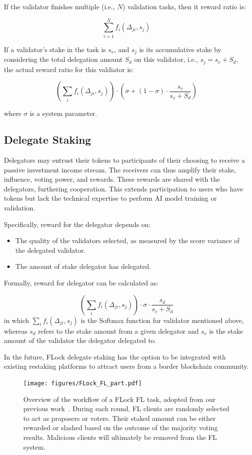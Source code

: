\documentclass[conference]{IEEEtran}
\begin{document}
If the validator finishes multiple (i.e., $N$) validation tasks, then it reward ratio is:

$$\sum_{i = 1}^{N}{f_i(\Delta_{ji}, s_j)}$$


If a validator’s stake in the task is $s_v$, and $s_j$ is its accumulative stake by considering the total delegation amount $S_d$ on this validator, i.e., $s_j = s_v + S_d$, the actual reward ratio for this valdiator is:

$$\left(\sum_i{f_i(\Delta_{ji}, s_j)}\right) \cdot \left(\sigma + (1-\sigma) \cdot \frac{s_v}{s_v+S_d}\right)$$

where $\sigma$ is a system parameter.


\subsection{Delegate Staking}
Delegators may entrust their tokens to participants of their choosing to receive a passive investment income stream. The receivers can thus amplify their stake, influence, voting power, and rewards. These rewards are shared with the delegators, furthering cooperation. This extends participation to users who have tokens but lack the technical expertise to perform AI model training or validation.

Specifically, reward for the delegator depends on:
\begin{itemize}
    \item The quality of the validators selected, as measured by the score variance of the delegated validator.
    \item The amount of stake delegator has delegated.
\end{itemize}

Formally, reward for delegator can be calculated as:

    $$\left(\sum_i{f_i(\Delta_{ji}, s_j)}\right) \cdot \sigma \cdot \frac{s_d}{s_v+S_d}$$
in which $\sum_i{f_i(\Delta_{ji}, s_j)}$ is the Softmax function for validator mentioned above, whereas $s_d$ refers to the stake amount from a given delegator and $s_v$ is the stake amount of the validator the delegator delegated to.

In the future, FLock delegate staking has the option to be integrated with existing restaking platforms to attract users from a border blockchain community.

\begin{figure}[t]
\centering
\texttt{[image: figures/FLock\_FL\_part.pdf]}
\caption{Overview of the workflow of a FLock FL task, adopted from our previous work~\cite{dong2023defending}. 
During each round, FL clients are randomly selected to act as proposers or voters. Their staked amount can be either rewarded or slashed based on the outcome of the majority voting results. Malicious clients will ultimately be removed from the FL system.}
\label{fig:FLock_FL_part}
\end{figure}
\end{document}
